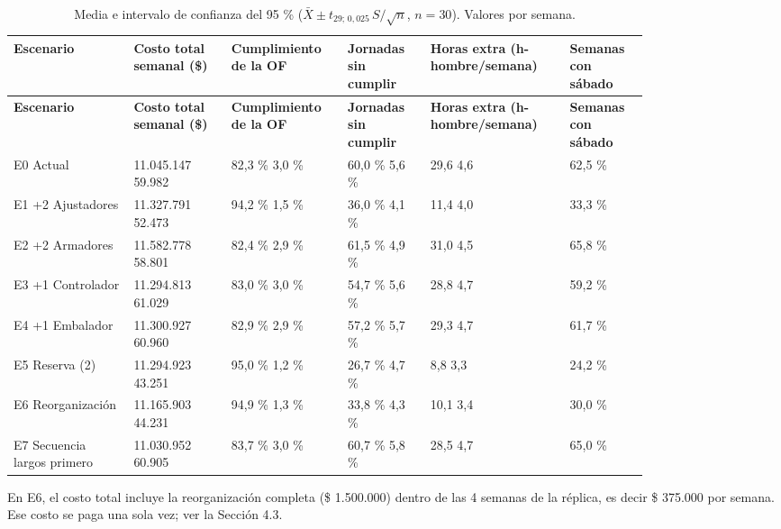 \documentclass[11pt,a4paper]{article}
\begin{document}
{\small
\begin{longtable}{P{0.160\linewidth}P{0.137\linewidth}P{0.125\linewidth}P{0.119\linewidth}P{0.172\linewidth}P{0.107\linewidth}}
\caption{Media e intervalo de confianza del 95 \% ($\bar{X} \pm t_{29;\,0{,}025}\,S/\sqrt{n}$, $n = 30$). Valores por semana.}\\
\textbf{Escenario} & \textbf{Costo total semanal (\$)} & \textbf{Cumplimiento de la OF} & \textbf{Jornadas sin cumplir} & \textbf{Horas extra (h-hombre/semana)} & \textbf{Semanas con sábado} \\
\endfirsthead
{}\textbf{Escenario} & \textbf{Costo total semanal (\$)} & \textbf{Cumplimiento de la OF} & \textbf{Jornadas sin cumplir} & \textbf{Horas extra (h-hombre/semana)} & \textbf{Semanas con sábado} \\
\endhead
E0 Actual & 11.045.147 \textpm{} 59.982 & 82,3 \% \textpm{} 3,0 \% & 60,0 \% \textpm{} 5,6 \% & 29,6 \textpm{} 4,6 & 62,5 \% \\
E1 +2 Ajustadores & 11.327.791 \textpm{} 52.473 & 94,2 \% \textpm{} 1,5 \% & 36,0 \% \textpm{} 4,1 \% & 11,4 \textpm{} 4,0 & 33,3 \% \\
E2 +2 Armadores & 11.582.778 \textpm{} 58.801 & 82,4 \% \textpm{} 2,9 \% & 61,5 \% \textpm{} 4,9 \% & 31,0 \textpm{} 4,5 & 65,8 \% \\
E3 +1 Controlador & 11.294.813 \textpm{} 61.029 & 83,0 \% \textpm{} 3,0 \% & 54,7 \% \textpm{} 5,6 \% & 28,8 \textpm{} 4,7 & 59,2 \% \\
E4 +1 Embalador & 11.300.927 \textpm{} 60.960 & 82,9 \% \textpm{} 2,9 \% & 57,2 \% \textpm{} 5,7 \% & 29,3 \textpm{} 4,7 & 61,7 \% \\
E5 Reserva (2) & 11.294.923 \textpm{} 43.251 & 95,0 \% \textpm{} 1,2 \% & 26,7 \% \textpm{} 4,7 \% & 8,8 \textpm{} 3,3 & 24,2 \% \\
E6 Reorganización & 11.165.903 \textpm{} 44.231 & 94,9 \% \textpm{} 1,3 \% & 33,8 \% \textpm{} 4,3 \% & 10,1 \textpm{} 3,4 & 30,0 \% \\
E7 Secuencia largos primero & 11.030.952 \textpm{} 60.905 & 83,7 \% \textpm{} 3,0 \% & 60,7 \% \textpm{} 5,8 \% & 28,5 \textpm{} 4,7 & 65,0 \% \\
\end{longtable}
}

En E6, el costo total incluye la reorganización completa (\$ 1.500.000) dentro de las 4 semanas de la réplica, es decir \$ 375.000 por semana. Ese costo se paga una sola vez; ver la Sección 4.3.
\end{document}
